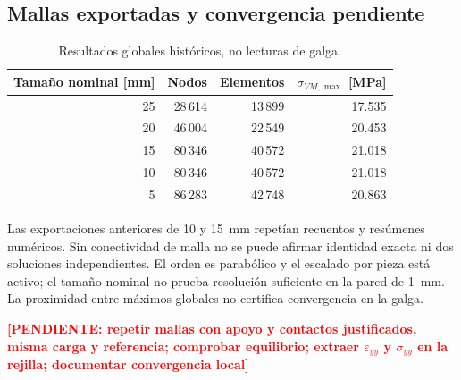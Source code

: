 \documentclass[11pt,a4paper]{article}
\newcommand{\pend}[1]{\textcolor{red}{\textbf{[PENDIENTE: #1]}}}
\begin{document}
\subsection{Mallas exportadas y convergencia pendiente}
\begin{table}[H]\centering\small
\caption{Resultados globales históricos, no lecturas de galga.}
\begin{tabular}{@{}rrrr@{}}\toprule
Tamaño nominal [mm] & Nodos & Elementos & $\sigma_{VM,\max}$ [MPa] \\\midrule
25 & 28\,614 & 13\,899 & 17.535 \\
20 & 46\,004 & 22\,549 & 20.453 \\
15 & 80\,346 & 40\,572 & 21.018 \\
10 & 80\,346 & 40\,572 & 21.018 \\
5 & 86\,283 & 42\,748 & 20.863 \\
\bottomrule\end{tabular}\end{table}
Las exportaciones anteriores de 10 y \SI{15}{mm} repetían recuentos y resúmenes numéricos. Sin conectividad de malla no se puede afirmar identidad exacta ni dos soluciones independientes. El orden es parabólico y el escalado por pieza está activo; el tamaño nominal no prueba resolución suficiente en la pared de \SI{1}{mm}. La proximidad entre máximos globales no certifica convergencia en la galga.

\pend{repetir mallas con apoyo y contactos justificados, misma carga y referencia; comprobar equilibrio; extraer $\varepsilon_{yy}$ y $\sigma_{yy}$ en la rejilla; documentar convergencia local}
\end{document}

